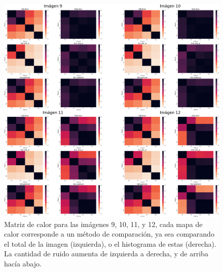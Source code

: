 \begin{figure}
    \centering
    \includegraphics[width=\textwidth]{figuras/heatmaps/heatmaps_app_2.png}
    \caption{Matriz de calor para las im\'agenes 9, 10, 11, y 12, cada mapa de calor corresponde a un m\'etodo de comparaci\'on, ya sea comparando el total de la imagen (izquierda), o el histograma de estas (derecha). La cantidad de ruido aumenta de izquierda a derecha, y de arriba hacía abajo.}
\end{figure}


